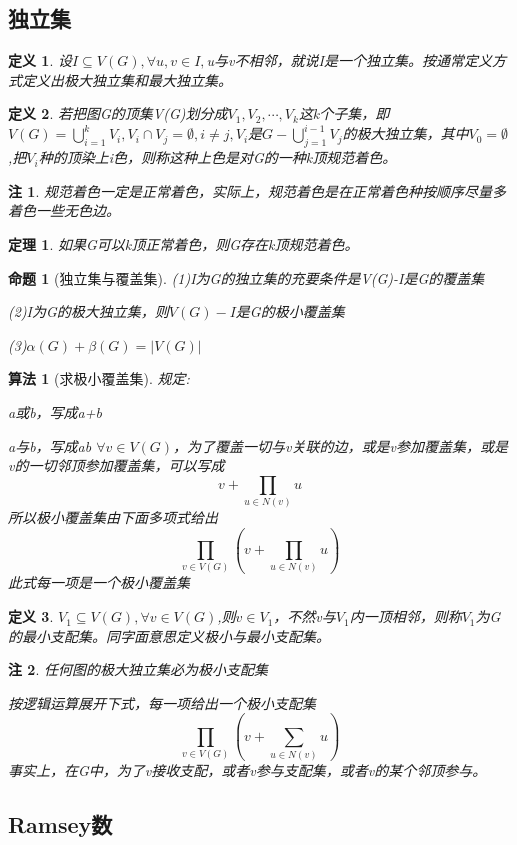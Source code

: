 \documentclass[UTF8]{ctexart}
\newtheorem{dfnt}{定义}
\newtheorem{thr}{定理}
\newtheorem*{note}{注}
\newtheorem{pro}{命题}
\newtheorem{alg}{算法}
\begin{document}
\subsection{独立集}
\begin{dfnt}
设$I \subseteq V(G),\forall u,v \in I,$u与v不相邻，就说I是一个独立集。按通常定义方式定义出极大独立集和最大独立集。
\end{dfnt}
\begin{dfnt}
若把图G的顶集V(G)划分成$V_1,V_2,\cdots,V_k$这k个子集，即$V(G)=\bigcup \limits_{i=1}^k V_i,V_i \cap V_j=\emptyset,i \neq j,V_i$是$G-\bigcup \limits_{j=1}^{i-1}V_j$的极大独立集，其中$V_0 = \emptyset$,把$V_i$种的顶染上i色，则称这种上色是对G的一种k顶规范着色。
\end{dfnt}
\begin{note}
规范着色一定是正常着色，实际上，规范着色是在正常着色种按顺序尽量多着色一些无色边。
\end{note}
\begin{thr}
如果G可以k顶正常着色，则G存在k顶规范着色。
\end{thr}
\begin{pro}[独立集与覆盖集]
\item (1)I为G的独立集的充要条件是V(G)-I是G的覆盖集
\item (2)I为G的极大独立集，则$V(G)-I$是G的极小覆盖集
\item (3)$\alpha (G)+\beta (G) = |V(G)|$
\end{pro}
\begin{alg}[求极小覆盖集]
规定:
\item a或b，写成a+b
\item a与b，写成ab
$\forall v \in V(G)$，为了覆盖一切与v关联的边，或是v参加覆盖集，或是v的一切邻顶参加覆盖集，可以写成$$v+\prod \limits_{u \in N(v)}u$$所以极小覆盖集由下面多项式给出$$\prod_{v \in V(G)}(v+\prod \limits_{u \in N(v)}u)$$此式每一项是一个极小覆盖集
\end{alg}
\begin{dfnt}
$V_1 \subseteq V(G),\forall v \in V(G)$,则$v \in V_1$，不然v与$V_1$内一顶相邻，则称$V_1$为G的最小支配集。同字面意思定义极小与最小支配集。
\end{dfnt}
\begin{note}
任何图的极大独立集必为极小支配集

按逻辑运算展开下式，每一项给出一个极小支配集$$\prod_{v \in V(G)}(v+\sum \limits_{u \in N(v)}u)$$事实上，在G中，为了v接收支配，或者v参与支配集，或者v的某个邻顶参与。
\end{note}

\subsection{Ramsey数}
\end{document}
